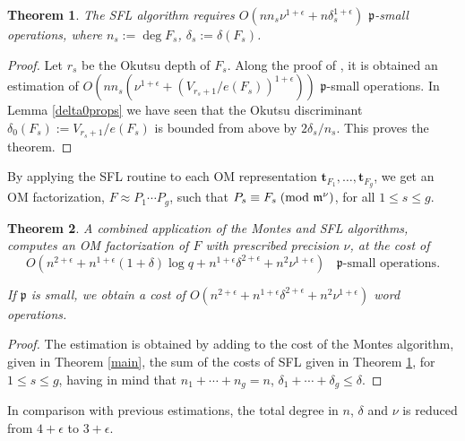 \documentclass{amsart}
\newtheorem{theorem}{Theorem}[section]
\begin{document}
\begin{theorem}\label{SFL}
The SFL algorithm requires $O(nn_s\nu^{1+\epsilon}+n\delta_s^{1+\epsilon})$ ${\mathfrak{p}}$-small operations, where $n_s:=\deg F_s$, $\delta_s:=\delta(F_s)$.
\end{theorem}

\begin{proof}
Let $r_s$ be the Okutsu depth of $F_s$. Along the proof of \cite[Lem. 6.5]{GNP}, it is obtained an estimation of $O\left(nn_s(\nu^{1+\epsilon}+(V_{r_s+1}/e(F_s))^{1+\epsilon})\right)$ ${\mathfrak{p}}$-small operations. In Lemma \ref{delta0props} we have seen that the Okutsu discriminant $\delta_0(F_s):=V_{r_s+1}/e(F_s)$ is bounded from above by
$2\delta_s/n_s$. This proves the theorem.
\end{proof}

By applying the SFL routine to each OM representation ${\mathbf{t}}_{F_1},\dots,{\mathbf{t}}_{F_g}$, we get an 
OM factorization, $F\approx P_1\cdots P_g$, such  that $P_s\equiv F_s{\; \mbox{\rm(mod }{{{{\mathfrak m}}^\nu}})}$, for all $1\le s\le g$.

\begin{theorem}\label{factorization}
A combined application of the Montes and SFL algorithms, computes an OM factorization of $F$  with prescribed precision $\nu$, at the cost of 
$$O\left(n^{2+\epsilon}+n^{1+\epsilon}(1+\delta)\log q+n^{1+\epsilon}\delta^{2+\epsilon}+n^2\nu^{1+\epsilon}\right)\ \mbox{ ${\mathfrak{p}}$-small operations}.$$
 
If ${\mathfrak{p}}$ is small, we obtain a cost of  
$O\left(n^{2+\epsilon}+n^{1+\epsilon}\delta^{2+\epsilon}+n^2\nu^{1+\epsilon}\right)$ word operations.
\end{theorem}

\begin{proof}
The estimation is obtained by adding to the cost of the Montes algorithm, given in Theorem \ref{main}, the sum of the costs of SFL given in Theorem \ref{SFL}, for $1\le s\le g$, having in mind that $n_1+\cdots+n_g=n$, $\delta_1+\cdots+\delta_g\le \delta$.  
\end{proof}

In comparison with previous estimations, the total degree in $n$, $\delta$ and $\nu$ is reduced from $4+\epsilon$ to $3+\epsilon$.
\end{document}
